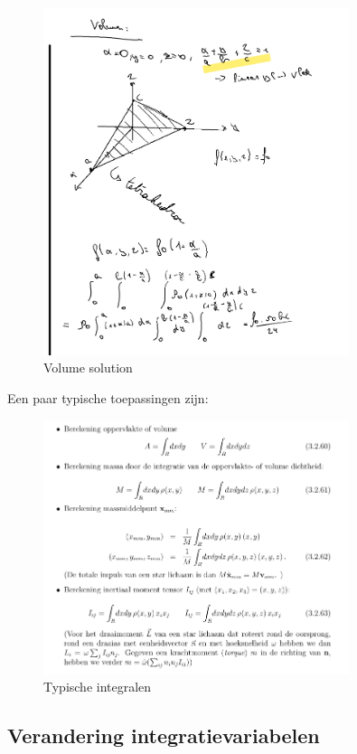 \documentclass[a4paper]{article}
\begin{document}
\begin{figure}[H]
	\centering
	\includegraphics[width=0.8\textwidth]{assets/volume_sol.png}
	\caption{Volume solution}
	\label{fig:volume_sol}
\end{figure}

Een paar typische toepassingen zijn:


\begin{figure}[H]
	\centering
	\includegraphics[width=0.8\textwidth]{assets/typische_integralen.png}
	\caption{Typische integralen}
	\label{fig:typische_integralen}
\end{figure}

\subsection{Verandering integratievariabelen}
\end{document}
